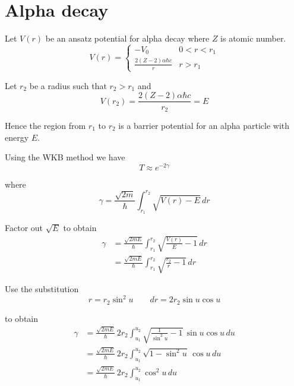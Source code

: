 





\section*{Alpha decay}

Let $V(r)$ be an ansatz potential for alpha decay where $Z$ is atomic number.
\begin{equation*}
V(r)=\begin{cases}
-V_0 & 0<r<r_1
\\[1ex]
{\displaystyle \frac{2(Z-2)\alpha\hbar c}{r}} & r>r_1
\end{cases}
\end{equation*}

Let $r_2$ be a radius such that $r_2>r_1$ and
\begin{equation*}
V(r_2)=\frac{2(Z-2)\alpha\hbar c}{r_2}=E
\end{equation*}

Hence the region from $r_1$ to $r_2$ is a barrier potential for an alpha particle with energy $E$.

\bigskip
Using the WKB method we have
\begin{equation*}
T\approx e^{-2\gamma}
\end{equation*}

where
\begin{equation*}
\gamma=\frac{\sqrt{2m}}{\hbar}\int_{r_1}^{r_2}\sqrt{V(r)-E}\,dr
\end{equation*}

Factor out $\sqrt E$ to obtain
\begin{align*}
\gamma&=\frac{\sqrt{2mE}}{\hbar}\int_{r_1}^{r_2}\sqrt{\frac{V(r)}{E}-1}\,dr
\\[1ex]
&=\frac{\sqrt{2mE}}{\hbar}\int_{r_1}^{r_2}\sqrt{\frac{r_2}{r}-1}\,dr
\end{align*}

Use the substitution
\begin{equation*}
r=r_2\sin^2u
\qquad
dr=2r_2\sin u\cos u
\end{equation*}

to obtain
\begin{align*}
\gamma&=\frac{\sqrt{2mE}}{\hbar}\,2r_2\int_{u_1}^{u_2}
\sqrt{\frac{1}{\sin^2u}-1}\,\sin u\cos u\,du
\\[1ex]
&=\frac{\sqrt{2mE}}{\hbar}\,2r_2\int_{u_1}^{u_2}\sqrt{1-\sin^2u}\,\cos u\,du
\\[1ex]
&=\frac{\sqrt{2mE}}{\hbar}\,2r_2\int_{u_1}^{u_2}\cos^2u\,du
\end{align*}

